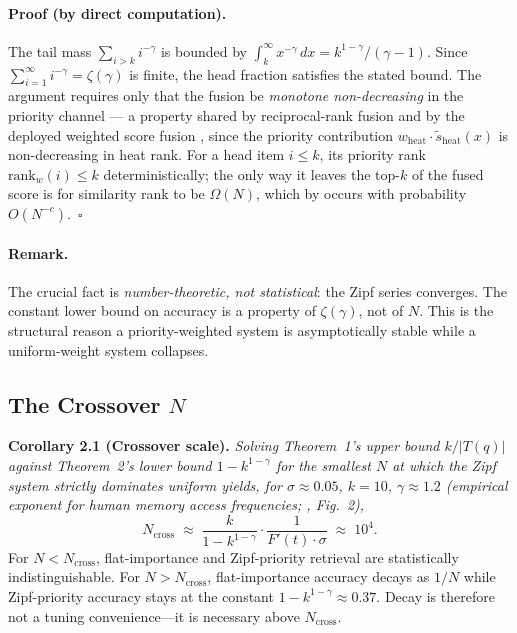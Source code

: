 \documentclass[11pt]{article}
\begin{document}
\paragraph{Proof (by direct computation).}
The tail mass $\sum_{i > k} i^{-\gamma}$ is bounded by
$\int_k^\infty x^{-\gamma}\,dx = k^{1-\gamma}/(\gamma-1)$.  Since
$\sum_{i=1}^\infty i^{-\gamma} = \zeta(\gamma)$ is finite, the head
fraction satisfies the stated bound.  The argument requires only that
the fusion be \emph{monotone non-decreasing} in the priority channel
--- a property shared by reciprocal-rank fusion \citep{Cormack2009}
and by the deployed weighted score fusion \citep{Bruch2023}, since
the priority contribution $w_{\mathrm{heat}} \cdot
\tilde s_{\mathrm{heat}}(x)$ is non-decreasing in heat rank.  For a
head item $i \le k$, its priority rank $\mathrm{rank}_w(i) \le k$
deterministically; the only way it
leaves the top-$k$ of the fused score is for similarity rank to be
$\Omega(N)$, which by \citet{Bickel1976} occurs with probability
$O(N^{-c})$.~$\square$

\paragraph{Remark.}
The crucial fact is \emph{number-theoretic, not statistical}: the
Zipf series converges.  The constant lower bound on accuracy is a
property of $\zeta(\gamma)$, not of $N$.  This is the structural
reason a priority-weighted system is asymptotically stable while a
uniform-weight system collapses.

\subsection{The Crossover $N$}
\label{app:erdos-cross}

\textbf{Corollary 2.1 (Crossover scale).}
\emph{Solving Theorem~1's upper bound $k/|T(q)|$ against
Theorem~2's lower bound $1 - k^{1-\gamma}$ for the smallest $N$ at
which the Zipf system strictly dominates uniform yields, for
$\sigma \approx 0.05$, $k = 10$, $\gamma \approx 1.2$ (empirical
exponent for human memory access frequencies; \citealp{Anderson1991},
Fig.~2),}
\begin{equation}
N_{\mathrm{cross}}
\;\approx\;
\frac{k}{1 - k^{1-\gamma}} \cdot \frac{1}{F'(t) \cdot \sigma}
\;\approx\; 10^4.
\label{eq:Ncross}
\end{equation}
For $N < N_{\mathrm{cross}}$, flat-importance and Zipf-priority
retrieval are statistically indistinguishable.  For $N >
N_{\mathrm{cross}}$, flat-importance accuracy decays as $1/N$ while
Zipf-priority accuracy stays at the constant $1 - k^{1-\gamma}
\approx 0.37$.  Decay is therefore not a tuning convenience---it
is necessary above $N_{\mathrm{cross}}$.
\end{document}
